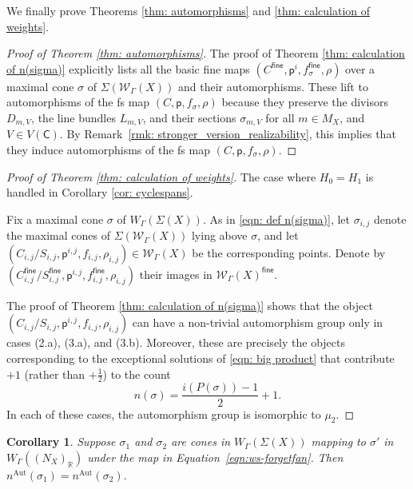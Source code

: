 \documentclass{article}
\def\cW{\mathcal{W}}
\newtheorem{corollary}[definition]{Corollary}
\newcommand{\tropC}{\mathsf{C}}
\newcommand{\fine}{\mathsf{fine}}
\newcommand{\nn}{n^{\operatorname{Aut}}}
\begin{document}
We finally prove Theorems \ref{thm: automorphisms} and \ref{thm: calculation of weights}.
    


\begin{proof}[Proof of Theorem \ref{thm: automorphisms}]
    The proof of Theorem \ref{thm: calculation of n(sigma)} explicitly lists all the basic fine maps $(C^{\mathsf{fine}}, \mathsf{p}^{i}, f_{\sigma}^{\mathsf{fine}}, \rho)$ over a maximal cone $\sigma$ of $\Sigma(\cW_{\Gamma}(X))$ and their automorphisms. These lift to automorphisms of the fs map $(C,\mathsf{p}, f_\sigma, \rho)$ because they preserve the divisors $D_{m,V}$, the line bundles $L_{m,V}$, and their sections $\sigma_{m,V}$ for all $m \in M_X$, and $V \in V(\tropC)$. By Remark~\ref{rmk: stronger_version_realizability}, this implies that they induce automorphisms of the fs map $(C,\mathsf{p}, f_\sigma, \rho)$.
\end{proof}

\begin{proof}[Proof of Theorem \ref{thm: calculation of weights}]
    The case where $H_0 = H_1$ is handled in Corollary \ref{cor: cyclespans}. 

    Fix a maximal cone $\sigma$ of $W_{\Gamma}(\Sigma(X))$. As in \eqref{eqn: def n(sigma)}, let $\sigma_{i,j}$ denote the maximal cones of $\Sigma(\cW_{\Gamma}(X))$ lying above $\sigma$, and let
$
(C_{i,j}/S_{i,j},\mathsf{p}^{i,j},f_{i,j},\rho_{i,j}) \in \cW_{\Gamma}(X)
$
be the corresponding points. Denote by
$
(C^\fine_{i,j}/S^\fine_{i,j},\mathsf{p}^{i,j},f^\fine_{i,j},\rho_{i,j})
$
their images in $\cW_{\Gamma}(X)^\fine$.

The proof of Theorem \ref{thm: calculation of n(sigma)} shows that the object
$
(C_{i,j}/S_{i,j},\mathsf{p}^{i,j},f_{i,j},\rho_{i,j})
$
can have a non-trivial automorphism group only in cases (2.a), (3.a), and (3.b). Moreover, these are precisely the objects corresponding to the exceptional solutions of \eqref{eqn: big product} that contribute $+1$ (rather than $+\frac12$) to the count
\[
n(\sigma)=\frac{i(P(\sigma))-1}{2}+1.
\]
In each of these cases, the automorphism group is isomorphic to $\mu_2$. 
    
    
    \end{proof}


\begin{corollary} \label{cor: n' sigma depends only on sigma'}
    Suppose $\sigma_1$ and $\sigma_2$ are cones in $W_\Gamma(\Sigma(X))$ mapping to $\sigma'$ in $W_\Gamma((N_X)_{\mathbb{R}})$ under the map in Equation~\eqref{eqn:ws-forgetfan}. Then $\nn(\sigma_1) = \nn(\sigma_2)$. 
\end{corollary}
\end{document}
